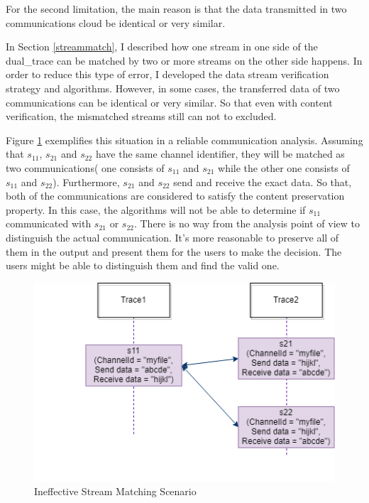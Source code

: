 For the second limitation, the main reason is that the data transmitted in two communications cloud be identical or very similar. 

In Section \ref{streammatch}, I described how one stream in one side of the dual\_trace can be matched by two or more streams on the other side happens. In order to reduce this type of error, I developed the data stream verification strategy and algorithms. However, in some cases, the transferred data of two communications can be identical or very similar. So that even with content verification, the mismatched streams still can not to excluded.

Figure \ref{secondlevelmatching} exemplifies this situation in a reliable communication analysis. Assuming that $s_{11}$, $s_{21}$ and $s_{22}$ have the same channel identifier, they will be matched as two communications( one consists of $s_{11}$ and $s_{21}$ while the other one consists of $s_{11}$ and $s_{22}$). Furthermore, $s_{21}$ and $s_{22}$ send and receive the exact data. So that, both of the communications are considered to satisfy the content preservation property. In this case, the algorithms will not be able to determine if  $s_{11}$ communicated with $s_{21}$ or $s_{22}$. There is no way from the analysis point of view to distinguish the actual communication. It's more reasonable to preserve all of them in the output and present them for the users to make the decision. The users might be able to distinguish them and find the valid one.


\begin{figure}[H]
\centerline{\includegraphics[scale=0.6]{Figures/secondlevelmatching}}
 \caption{Ineffective Stream Matching Scenario}
\label{secondlevelmatching}
\end{figure}



